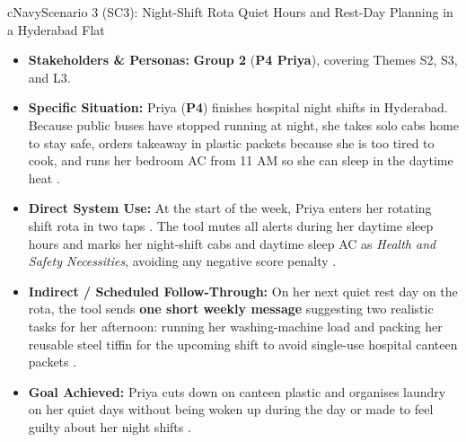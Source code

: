 \documentclass[12pt, a4paper]{article}
\begin{document}
\begin{scenariocard}{cNavy}{Scenario 3 (SC3): Night-Shift Rota Quiet Hours and Rest-Day Planning in a Hyderabad Flat}
\begin{itemize}
    \item \textbf{Stakeholders \& Personas:} \textbf{Group 2} (\textbf{P4 Priya}), covering Themes S2, S3, and L3.
    \item \textbf{Specific Situation:} Priya (\textbf{P4}) finishes hospital night shifts in Hyderabad. Because public buses have stopped running at night, she takes solo cabs home to stay safe, orders takeaway in plastic packets because she is too tired to cook, and runs her bedroom AC from 11 AM so she can sleep in the daytime heat \cite{cf9}.
    \item \textbf{Direct System Use:} At the start of the week, Priya enters her rotating shift rota in two taps \cite{cf9}. The tool mutes all alerts during her daytime sleep hours and marks her night-shift cabs and daytime sleep AC as \textit{Health and Safety Necessities}, avoiding any negative score penalty \cite{cf5, cf9}.
    \item \textbf{Indirect / Scheduled Follow-Through:} On her next quiet rest day on the rota, the tool sends \textbf{one short weekly message} suggesting two realistic tasks for her afternoon: running her washing-machine load and packing her reusable steel tiffin for the upcoming shift to avoid single-use hospital canteen packets \cite{cf9}.
    \item \textbf{Goal Achieved:} Priya cuts down on canteen plastic and organises laundry on her quiet days without being woken up during the day or made to feel guilty about her night shifts \cite{cf9}.
\end{itemize}
\end{scenariocard}
\end{document}
